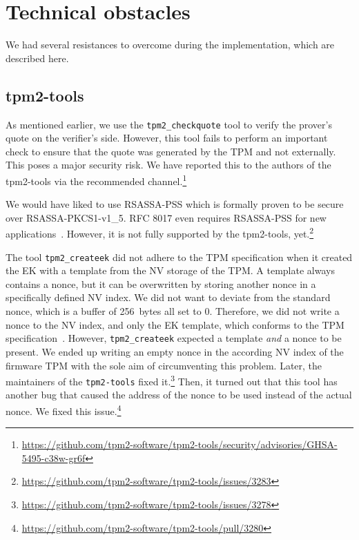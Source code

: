 \section{Technical obstacles}

We had several resistances to overcome during the implementation, which are described here.

\subsection{tpm2-tools}

As mentioned earlier, we use the \texttt{tpm2\_checkquote} tool to verify the prover's quote on the verifier's side.
However, this tool fails to perform an important check to ensure that the quote was generated by the TPM and not externally.
This poses a major security risk.
We have reported this to the authors of the tpm2-tools via the recommended channel.\footnote{\url{https://github.com/tpm2-software/tpm2-tools/security/advisories/GHSA-5495-c38w-gr6f}}

We would have liked to use RSASSA-PSS which is formally proven to be secure over RSASSA-PKCS1-v1\_5.
RFC 8017 even requires RSASSA-PSS for new applications~\cite{Moriarty2016}.
However, it is not fully supported by the tpm2-tools, yet.\footnote{\url{https://github.com/tpm2-software/tpm2-tools/issues/3283}}

The tool \texttt{tpm2\_createek} did not adhere to the TPM specification when it created the EK with a template from the NV storage of the TPM\@.
A template always contains a nonce, but it can be overwritten by storing another nonce in a specifically defined NV index.
We did not want to deviate from the standard nonce, which is a buffer of 256~bytes all set to 0.
Therefore, we did not write a nonce to the NV index, and only the EK template, which conforms to the TPM specification~\cite{tcg-ek}.
However, \texttt{tpm2\_createek} expected a template \emph{and} a nonce to be present.
We ended up writing an empty nonce in the according NV index of the firmware TPM with the sole aim of circumventing this problem.
Later, the maintainers of the \texttt{tpm2-tools} fixed it.\footnote{\url{https://github.com/tpm2-software/tpm2-tools/issues/3278}}
Then, it turned out that this tool has another bug that caused the address of the nonce  to be used instead of the actual nonce.
We fixed this issue.\footnote{\url{https://github.com/tpm2-software/tpm2-tools/pull/3280}}


